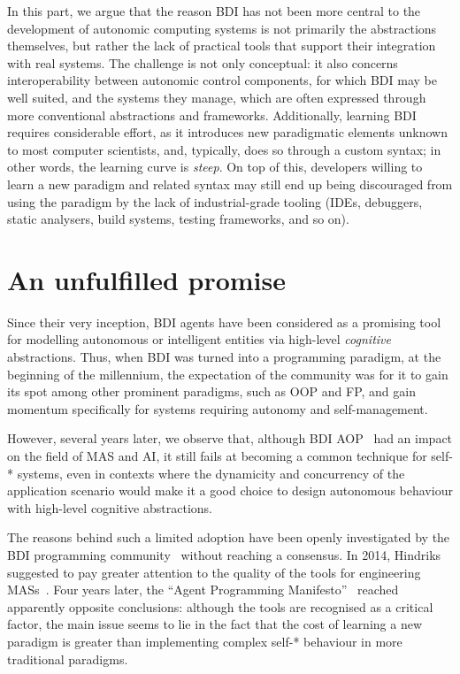 In this part, we argue that the reason \ac{BDI} has not been more central to the development of autonomic computing systems is not primarily the abstractions themselves,
but rather the lack of practical tools that support their integration with real systems.
The challenge is not only conceptual: it also concerns interoperability between autonomic control components,
for which \ac{BDI} may be well suited,
and the systems they manage,
which are often expressed through more conventional abstractions and frameworks.
Additionally,
learning \ac{BDI} requires considerable effort,
as it introduces new paradigmatic elements unknown to most computer scientists,
and, typically, does so through a custom syntax;
in other words, the learning curve is \emph{steep}.
%
On top of this, developers willing to learn a new paradigm and related syntax
may still end up being discouraged from using the paradigm by the lack of industrial-grade
tooling (\acp{IDE}, debuggers, static analysers, build systems, testing frameworks, and so on).


\section{An unfulfilled promise}

Since their very inception,
\ac{BDI} agents have been considered as
a promising tool for modelling autonomous or intelligent entities
via high-level \emph{cognitive} abstractions.
%
Thus,
when \ac{BDI} was turned into a programming paradigm,
at the beginning of the millennium,
the expectation of the community was for it to gain its spot among other prominent paradigms,
such as \ac{OOP} and \ac{FP},
and gain momentum specifically for systems requiring autonomy and self-management.

However,
several years later,
we observe that,
although \ac{BDI} \ac{AOP}~\cite{DBLP:journals/ai/Shoham93} had an impact on the field of \ac{MAS} and \ac{AI},
it still fails at becoming a common technique for self-* systems,
even in contexts where the dynamicity and concurrency of the application scenario would make it
a good choice to design autonomous behaviour
with high-level cognitive abstractions.

The reasons behind such a limited adoption have been openly investigated by the
\ac{BDI} programming community~\cite{DBLP:journals/sigsoft/MascardiWR19}
without reaching a consensus.
%
In 2014, Hindriks suggested to pay greater attention to the quality of the tools for engineering \acp{MAS}~\cite{DBLP:conf/dalt/Hindriks14}.
%
Four years later, the ``Agent Programming Manifesto''~\cite{DBLP:journals/ijaose/Logan18} reached apparently opposite conclusions:
although the tools are recognised as a critical factor,
the main issue seems to lie in the fact that the cost of
learning a new paradigm
is greater than implementing complex self-* behaviour in more traditional paradigms.

